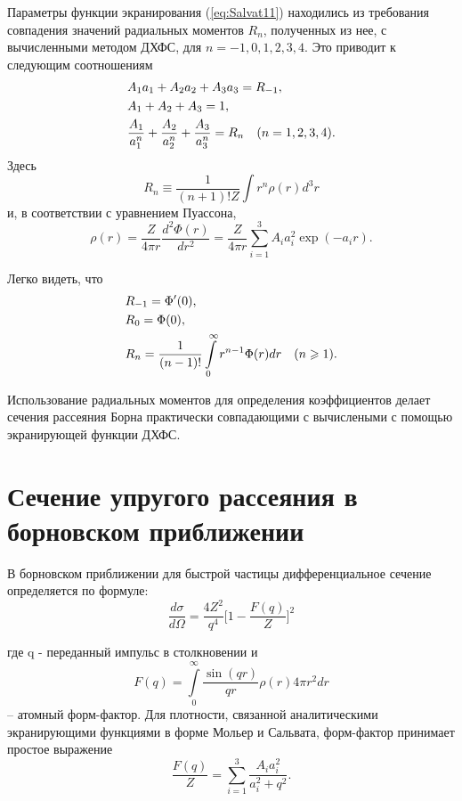 \documentclass[a4paper,14pt]{extarticle} %
\begin{document}
Параметры функции экранирования (\ref{eq:Salvat11}) находились из требования совпадения значений радиальных моментов $R_n$, полученных из нее, с вычисленными методом ДХФС, для $n = - 1, 0, 1, 2, 3, 4 $. Это приводит к следующим соотношениям
\begin{equation}
\begin{gathered}
  A_1 a_1 + A_2 a_2 + A_3 a_3 = R_{-1}, \hfill \\
  A_1 + A_2 + A_3 = 1, \hfill \\
  \frac{A_1}{a_1^n} + \frac{A_2}{a_2^n} + \frac{A_3}{a_3^n} = R_n\quad (n = 1,2,3,4). \hfill \\
\end{gathered}
\label{eq:Salvat15}
\end{equation}
Здесь
\[
R_n \equiv \frac{1}{{(n + 1)!Z}}\int {{r^n}\rho (r){d^3}r}
\label{eq:Salvat13}
\]
и, в соответствии с уравнением Пуассона,
\begin{equation}
\rho (r) = \frac{Z}{4\pi r}\frac{d^2 \Phi(r)}{d r^2}
= \frac{Z}{4\pi r}\sum\limits_{i = 1}^3 {{A_i}a_i^2\exp ( - {a_i}r)} .
\label{eq:rhoPoisson}
\end{equation}

Легко видеть, что
\[
\begin{gathered}
  {R_{ - 1}} = \Phi '(0), \hfill \\
  {R_0} = \Phi (0), \hfill \\
  {R_n} = \frac{1}
{{(n - 1)!}}\int\limits_0^\infty  {{r^{n - 1}}\Phi (r)dr\quad (n \geqslant 1).}  \hfill \\
\end{gathered}
\]

Использование радиальных моментов для определения коэффициентов делает сечения рассеяния Борна практически 
совпадающими с вычислеными с помощью экранирующей функции ДХФС. 


\section{Сечение упругого рассеяния в борновском приближении}

В борновском приближении для быстрой частицы дифференциальное сечение определяется по формуле:
\begin{equation*}
	\frac{d\sigma}{d\Omega} =
	\frac{4Z^2}{q^4}
	\Big[
		1 - \frac{F(q)}{Z}
	\Big]^2
\end{equation*}

где q - переданный импульс в столкновении и 
\begin{equation}
F(q)=\int\limits_0^{\infty}\frac{\sin(qr)}{qr}\rho(r)4\pi r^2dr
\label{eq:b2}
\end{equation}
-- атомный форм-фактор. Для плотности, связанной аналитическими экранирующими функциями в форме Мольер и Сальвата, форм-фактор 
принимает простое выражение 
\begin{equation}
\frac{F(q)}{Z}=\sum_{i=1}^3\frac{A_ia_i^2}{a_i^2+q^2}.
\label{eq:b3}
\end{equation}
\end{document}
